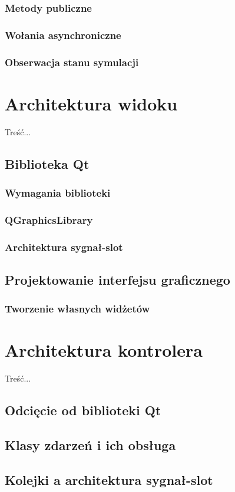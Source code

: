\subsubsection{Metody publiczne}
\subsubsection{Wołania asynchroniczne}
\subsubsection{Obserwacja stanu symulacji}

\section[Architektura widoku][Architektura widoku]{Architektura widoku}
\par{ Treść... }
\subsection{Biblioteka Qt}
\subsubsection{Wymagania biblioteki}
\subsubsection{QGraphicsLibrary}
\subsubsection{Architektura sygnał-slot}
\subsection{Projektowanie interfejsu graficznego}
\subsubsection{Tworzenie własnych widżetów}

\section[Architektura kontrolera][Architektura kontrolera]{Architektura kontrolera}
\par{ Treść... }
\subsection{Odcięcie od biblioteki Qt}
\subsection{Klasy zdarzeń i ich obsługa}
\subsection{Kolejki a architektura sygnał-slot}